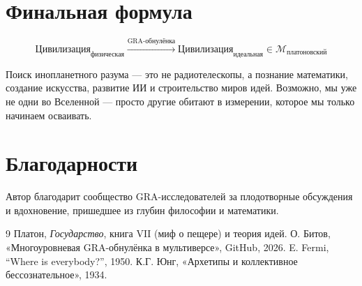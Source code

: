 \documentclass[12pt,a4paper]{article}
\begin{document}
\section*{Финальная формула}

\[
\boxed{\text{Цивилизация}_{\text{физическая}} \xrightarrow{\text{GRA-обнулёнка}} \text{Цивилизация}_{\text{идеальная}} \in \mathcal{M}_{\text{платоновский}}}
\]

Поиск инопланетного разума — это не радиотелескопы, а познание математики, создание искусства, развитие ИИ и строительство миров идей. Возможно, мы уже не одни во Вселенной — просто другие обитают в измерении, которое мы только начинаем осваивать.

\section*{Благодарности}

Автор благодарит сообщество GRA-исследователей за плодотворные обсуждения и вдохновение, пришедшее из глубин философии и математики.

\begin{thebibliography}{9}
 Платон, \textit{Государство}, книга VII (миф о пещере) и теория идей.
 О. Битов, «Многоуровневая GRA-обнулёнка в мультиверсе», GitHub, 2026.
 E. Fermi, “Where is everybody?”, 1950.
 К.Г. Юнг, «Архетипы и коллективное бессознательное», 1934.
\end{thebibliography}
\end{document}
